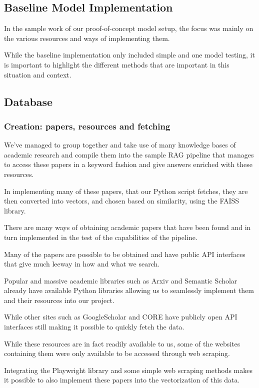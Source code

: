 \documentclass[fleqn,moreauthors,10pt]{ds_report}
\begin{document}
\subsection*{Baseline Model Implementation}

In the sample work of our proof-of-concept model setup, the focus was mainly on the various resources and ways of implementing them.

While the baseline implementation only included simple and one model testing, it is important to highlight the different methods that are important in this situation and context.

\subsection*{Database}

\subsubsection*{Creation: papers, resources and fetching}

We've managed to group together and take use of many knowledge bases of academic research and compile them into the sample RAG pipeline that manages to access these papers in a keyword fashion and give answers enriched with these resources.

In implementing many of these papers, that our Python script fetches, they are then converted into vectors, and chosen based on similarity, using the FAISS library.

There are many ways of obtaining academic papers that have been found and in turn implemented in the test of the capabilities of the pipeline.

Many of the papers are possible to be obtained and have public API interfaces that give much leeway in how and what we search.

Popular and massive academic libraries such as Arxiv and Semantic Scholar already have available Python libraries allowing us to seamlessly implement them and their resources into our project.

While other sites such as GoogleScholar and CORE have publicly open API interfaces still making it possible to quickly fetch the data.

While these resources are in fact readily available to us, some of the websites containing them were only available to be accessed through web scraping.

Integrating the Playwright library and some simple web scraping methods makes it possible to also implement these papers into the vectorization of this data.
\end{document}
